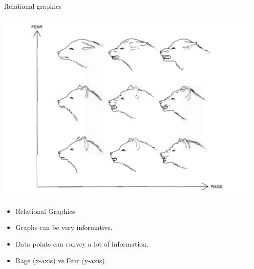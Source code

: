 \documentclass[
  ignorenonframetext,
]{beamer}
\begin{document}
\begin{frame}{Relational graphics}
\label{relational-graphics-4}
\begin{minipage}{0.45\textwidth}
\centering
\includegraphics[width=\textwidth]{excellence_figs/fig_27.png}
\end{minipage}
\hfill
\begin{minipage}{0.5\textwidth}
\footnotesize
\begin{itemize}
  \item Relational Graphics
  \item Graphs can be very informative.
  \item Data points can convey a lot of information.
  \item Rage (x-axis) vs Fear (y-axis).
\end{itemize}
\end{minipage}
\end{frame}
\end{document}
